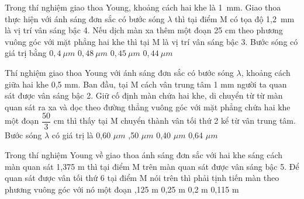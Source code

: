 \begin{ex}%
Trong thí nghiệm giao thoa Young, khoảng cách hai khe là 1\ mm. Giao thoa thực hiện với ánh sáng đơn sắc có bước sóng $\lambda$ thì tại điểm M có tọa độ 1,2\ mm là vị trí vân sáng bậc 4. Nếu dịch màn xa thêm một đoạn 25 cm theo phương vuông góc với mặt phẳng hai khe thì tại M là vị trí vân sáng bậc 3. Bước sóng có giá trị bằng
\choice
{\True $0,4\ \mu m$}
{$0,48\ \mu m$}
{$0,45\ \mu m$}
{$0,44\ \mu m$}
\end{ex} 
\begin{ex}%
Thí nghiệm giao thoa Young với ánh sáng đơn sắc có bước sóng $\lambda $, khoảng cách giữa hai khe 0,5 mm. Ban đầu, tại M cách vân trung tâm 1 mm người ta quan sát được vân sáng bậc 2. Giữ cố định màn chứa hai khe, di chuyển từ từ màn quan sát ra xa và dọc theo đường thẳng vuông góc với mặt phẳng chứa hai khe một đoạn $\dfrac{50}{3} $ cm thì thấy tại M chuyển thành vân tối thứ 2 kể từ vân trung tâm. Bước sóng $\lambda $ có giá trị là
\choice
{0,60 $\mu m $}
{,50 $\mu m $}
{0,40 $\mu m $}
{0,64 $\mu m $}
\end{ex} 
\begin{ex}%
Trong thí nghiệm Young về giao thoa ánh sáng đơn sắc với hai khe sáng cách màn quan sát 1,375 m thì tại điểm M trên màn quan sát được vân sáng bậc 5. Để quan sát được vân tối thứ 6 tại điểm M nói trên thì phải tịnh tiến màn theo phương vuông góc với nó một đoạn
\choice
{,125 m}
{0,25 m}
{0,2 m}
{0,115 m}
\end{ex} 

